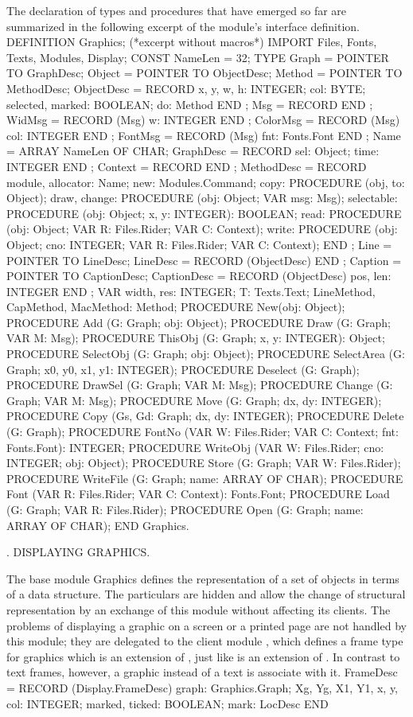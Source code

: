 The declaration of types and procedures that have emerged so far are summarized in the following excerpt of the module's interface definition.
\begintt
DEFINITION Graphics; (*excerpt without macros*) IMPORT Files, Fonts, Texts, Modules, Display;
CONST NameLen = 32;
TYPE Graph = POINTER TO GraphDesc; Object = POINTER TO ObjectDesc; Method = POINTER TO MethodDesc;
ObjectDesc = RECORD
x, y, w, h: INTEGER;
col: BYTE;
selected, marked: BOOLEAN; do: Method
END ;
Msg = RECORD END ;
WidMsg = RECORD (Msg) w: INTEGER END ; ColorMsg = RECORD (Msg) col: INTEGER END ; FontMsg = RECORD (Msg) fnt: Fonts.Font END ; Name = ARRAY NameLen OF CHAR;
GraphDesc = RECORD sel: Object; time: INTEGER
END ;
Context = RECORD END ;
MethodDesc = RECORD
module, allocator: Name;
new: Modules.Command;
copy: PROCEDURE (obj, to: Object);
draw, change: PROCEDURE (obj: Object; VAR msg: Msg);
selectable: PROCEDURE (obj: Object; x, y: INTEGER): BOOLEAN;
read: PROCEDURE (obj: Object; VAR R: Files.Rider; VAR C: Context);
write: PROCEDURE (obj: Object; cno: INTEGER; VAR R: Files.Rider; VAR C: Context);
END ;
Line = POINTER TO LineDesc;
LineDesc = RECORD (ObjectDesc) END ;
Caption = POINTER TO CaptionDesc;
CaptionDesc = RECORD (ObjectDesc) pos, len: INTEGER END ;
VAR width, res: INTEGER;
T: Texts.Text;
LineMethod, CapMethod, MacMethod: Method;
PROCEDURE New(obj: Object);
PROCEDURE Add (G: Graph; obj: Object);
PROCEDURE Draw (G: Graph; VAR M: Msg);
PROCEDURE ThisObj (G: Graph; x, y: INTEGER): Object; PROCEDURE SelectObj (G: Graph; obj: Object);
PROCEDURE SelectArea (G: Graph; x0, y0, x1, y1: INTEGER);
PROCEDURE Deselect (G: Graph); PROCEDURE DrawSel (G: Graph; VAR M: Msg);
PROCEDURE Change (G: Graph; VAR M: Msg); PROCEDURE Move (G: Graph; dx, dy: INTEGER); PROCEDURE Copy (Gs, Gd: Graph; dx, dy: INTEGER); PROCEDURE Delete (G: Graph);
PROCEDURE FontNo (VAR W: Files.Rider; VAR C: Context; fnt: Fonts.Font): INTEGER; PROCEDURE WriteObj (VAR W: Files.Rider; cno: INTEGER; obj: Object); PROCEDURE Store (G: Graph; VAR W: Files.Rider);
PROCEDURE WriteFile (G: Graph; name: ARRAY OF CHAR);
PROCEDURE Font (VAR R: Files.Rider; VAR C: Context): Fonts.Font; PROCEDURE Load (G: Graph; VAR R: Files.Rider);
PROCEDURE Open (G: Graph; name: ARRAY OF CHAR);
END Graphics.
\endtt

. DISPLAYING GRAPHICS.

The base module Graphics defines the representation of a set of objects in terms of a data structure. The particulars are hidden and allow the change of structural representation by an exchange of this module without affecting its clients. The problems of displaying a graphic on a screen or a printed page are not handled by this module; they are delegated to the client module , which defines a frame type for graphics which is an extension of , just like  is an extension of . In contrast to text frames, however, a graphic instead of a text is associate with it.
\begintt
FrameDesc = RECORD (Display.FrameDesc) graph: Graphics.Graph;
Xg, Yg, X1, Y1, x, y, col: INTEGER; marked, ticked: BOOLEAN;
mark: LocDesc
END
\endtt

